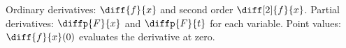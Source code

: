 \documentclass{article}
\begin{document}
Ordinary derivatives: $\diff{f}{x}$ and second order $\diff[2]{f}{x}$.
Partial derivatives: $\diffp{F}{x}$ and $\diffp{F}{t}$ for each variable.
Point values: $\diff{f}{x}(0)$ evaluates the derivative at zero.
\end{document}
